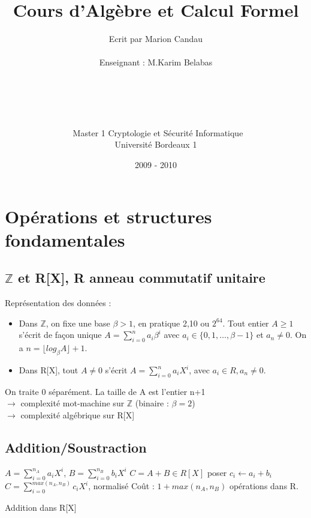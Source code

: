 \documentclass[12pt,a4paper]{report}
\title{\Huge{Cours d'Algèbre et Calcul Formel}}
\author{Ecrit par Marion Candau \\\\
Enseignant : M.Karim Belabas\\\\\\\\\\\\\
Master 1 Cryptologie et Sécurité Informatique\\
Université Bordeaux 1}
\date{2009 - 2010}
\begin{document}
\maketitle
\tableofcontents
\newpage 

\chapter{Opérations et structures fondamentales}
\section{$\mathbb{Z}$ et R[X], R anneau commutatif unitaire}
Représentation des données :\\
\begin{itemize}
\item Dans $\mathbb{Z}$, on fixe une base $\beta > 1$, en pratique 2,10 ou $2^{64}$. Tout entier $A \geqslant 1$ s'écrit de façon unique $ \displaystyle A=\sum_{i=0}^{n} a_i \beta^i$ avec $ a_i \in \{0,1,\ldots,\beta -1\}$ et $a_n \neq 0$. On a $n=\lfloor log_{\beta} A\rfloor + 1$.
\item Dans R[X], tout $A \neq 0$ s'écrit $\displaystyle A=\sum_{i=0}^{n} a_i X^i$, avec $a_i \in R, a_n \neq 0 $.
\end{itemize}
On traite 0 séparément. La taille de A est l'entier n+1\\
$ \rightarrow $ complexité mot-machine sur $\mathbb{Z}$ (binaire : $\beta =2$)\\
$ \rightarrow $ complexité algébrique sur R[X]
\section{Addition/Soustraction}
\begin{algorithm}[h!]

\begin{algorithmic}
\REQUIRE $\displaystyle A=\sum_{i=0}^{n_A} a_i X^i$, $B = \displaystyle \sum_{i=0}^{n_B} b_i X^i$
\ENSURE $ C=A+B \in R[X] $
\STATE poser $c_i \leftarrow a_i + b_i$ \ENDFOR
\RETURN $C=\displaystyle \sum_{i=0}^{max(n_A,n_B)}c_iX^i$, normalisé
\STATE Coût : $1 + max(n_A,n_B) $ opérations dans R.
\end{algorithmic}
\caption{Addition dans R[X]}
\end{algorithm}
\end{document}
